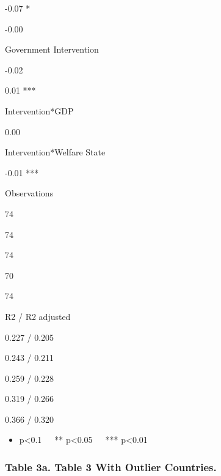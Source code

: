 \documentclass[
]{article}
\providecommand{\tightlist}{%
  \setlength{\itemsep}{0pt}\setlength{\parskip}{0pt}}
\begin{document}
-0.07 *

-0.00

Government Intervention

-0.02

0.01 ***

Intervention*GDP

0.00

Intervention*Welfare State

-0.01 ***

Observations

74

74

74

70

74

R2 / R2 adjusted

0.227 / 0.205

0.243 / 0.211

0.259 / 0.228

0.319 / 0.266

0.366 / 0.320

\begin{itemize}
\tightlist
\item
  p\textless0.1~~~** p\textless0.05~~~*** p\textless0.01
\end{itemize}

\hypertarget{table-3a.-table-3-with-outlier-countries.}{%
\subsubsection{Table 3a. Table 3 With Outlier
Countries.}\label{table-3a.-table-3-with-outlier-countries.}}
\end{document}
